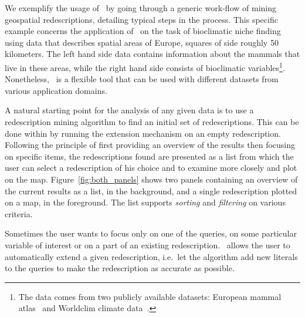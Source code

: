 
We exemplify the usage of \Siren\ by going through a generic work-flow
of mining geospatial redescriptions, detailing typical steps in the
process.  This specific example concerns the application of \Siren\ on
the task of bioclimatic niche finding using data that describes
spatial areas of Europe, squares of side roughly 50 kilometers.  The
left hand side data contains information about the mammals that live
in these areas, while the right hand side consists of bioclimatic
variables\footnote{The data comes from two publicly available
  datasets: European mammal atlas~\cite{mitchell-jones99atlas} and
  Worldclim climate data~\cite{hijmans05very}.}.  Nonetheless, \Siren\
is a flexible tool that can be used with different datasets from
various application domains.


 A natural starting point for the
analysis of any given data is to use a redescription mining algorithm
to find an initial set of redescriptions.  This can be done within 
\Siren{} by running the extension mechanism on an empty redescription.
Following the principle of first providing an overview of the results
then focusing on specific items, the redescriptions found are
presented as a list from which the user can select a redescription of
his choice and to examine more closely and plot on the map.
Figure~\ref{fig:both_panels} shows two panels containing an overview of
the current results as a list, in the background, and a single
redescription plotted on a map, in the foreground.
The list supports \emph{sorting} and \emph{filtering} on various criteria.

 Sometimes the user wants to focus only
on one of the queries, on some particular variable of interest or on a
part of an existing redescription.  \Siren\ allows the user to
automatically extend a given redescription, i.e.\ let the algorithm
add new literals to the queries to make the redescription as accurate
as possible.

